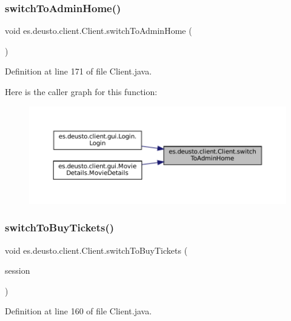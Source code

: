 \subsubsection{\texorpdfstring{switchToAdminHome()}{switchToAdminHome()}}
{\footnotesize\ttfamily void es.\+deusto.\+client.\+Client.\+switch\+To\+Admin\+Home (\begin{DoxyParamCaption}{ }\end{DoxyParamCaption})}



Definition at line 171 of file Client.\+java.

Here is the caller graph for this function\+:
\nopagebreak
\begin{figure}[H]
\begin{center}
\leavevmode
\includegraphics[width=350pt]{classes_1_1deusto_1_1client_1_1_client_a3fbd67bddee7a6c6ed8466ed5b2415a7_icgraph}
\end{center}
\end{figure}
\mbox{\label{classes_1_1deusto_1_1client_1_1_client_a8ce2f6d11e690d42dbe756d10ccee160}} 
\subsubsection{\texorpdfstring{switchToBuyTickets()}{switchToBuyTickets()}}
{\footnotesize\ttfamily void es.\+deusto.\+client.\+Client.\+switch\+To\+Buy\+Tickets (\begin{DoxyParamCaption}\item[{\mbox{\hyperlink{classes_1_1deusto_1_1server_1_1data_1_1_session_d_t_o}{Session\+D\+TO}}}]{session }\end{DoxyParamCaption})}



Definition at line 160 of file Client.\+java.

